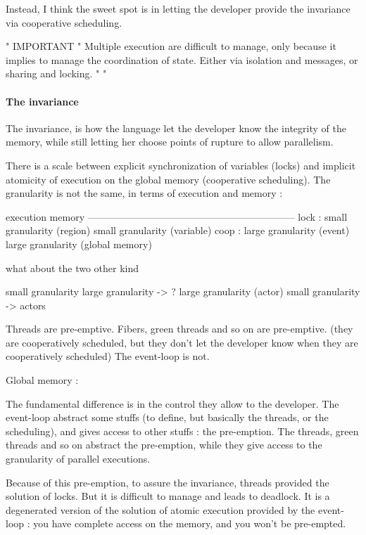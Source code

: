 Instead, I think the sweet spot is in letting the developer provide the invariance via cooperative scheduling.

"                               IMPORTANT                                     "
Multiple execution are difficult to manage, only because it implies to manage the coordination of state.
Either via isolation and messages, or sharing and locking.
"                                                                             "

\paragraph{The invariance}

The invariance, is how the language let the developer know the integrity of the memory, while still letting her choose points of rupture to allow parallelism.

There is a scale between explicit synchronization of variables (locks) and implicit atomicity of execution on the global memory (cooperative scheduling).
The granularity is not the same, in terms of execution and memory :

          execution                      memory
        ---------------------------------------------------------------
lock :    small granularity (region)     small granularity (variable)
coop :    large granularity (event)      large granularity (global memory)

what about the two other kind

          small granularity              large granularity     ->    ?
          large granularity (actor)      small granularity     ->  actors




Threads are pre-emptive.
Fibers, green threads and so on are pre-emptive. (they are cooperatively scheduled, but they don't let the developer know when they are cooperatively scheduled)
The event-loop is not.

Global memory :

The fundamental difference is in the control they allow to the developer.
The event-loop abstract some stuffs (to define, but basically the threads, or the scheduling), and gives access to other stuffs : the pre-emption.
The threads, green threads and so on abstract the pre-emption, while they give access to the granularity of parallel executions.

Because of this pre-emption, to assure the invariance, threads provided the solution of locks.
But it is difficult to manage and leads to deadlock.
It is a degenerated version of the solution of atomic execution provided by the event-loop : you have complete access on the memory, and you won't be pre-empted.

